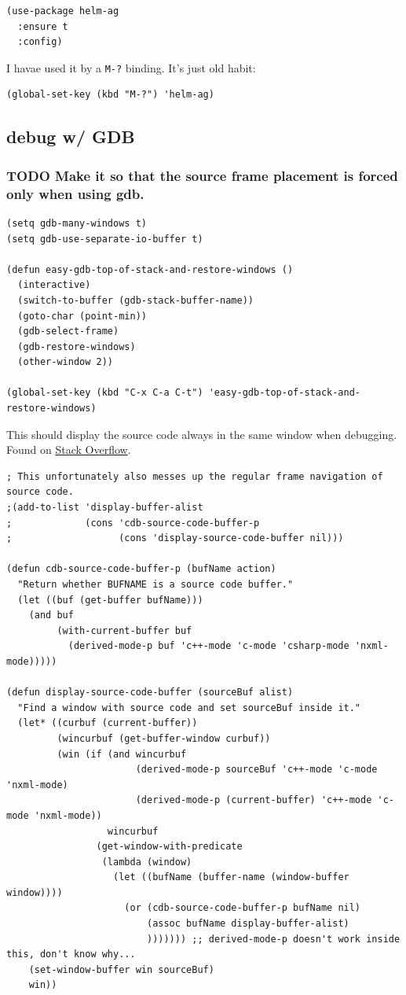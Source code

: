 \documentclass[11pt]{article}
\begin{document}
\begin{verbatim}
(use-package helm-ag
  :ensure t
  :config)
\end{verbatim}

I havae used it by a \texttt{M-?} binding. It's just old habit:
\begin{verbatim}
(global-set-key (kbd "M-?") 'helm-ag)
\end{verbatim}

\subsection{debug w/ GDB}
\label{sec:orge831571}
\subsubsection{{\bfseries\sffamily TODO} Make it so that the source frame placement is forced only when using gdb.}
\label{sec:orgcfc2186}

\begin{verbatim}
(setq gdb-many-windows t)
(setq gdb-use-separate-io-buffer t)

(defun easy-gdb-top-of-stack-and-restore-windows ()
  (interactive)
  (switch-to-buffer (gdb-stack-buffer-name))
  (goto-char (point-min))
  (gdb-select-frame)
  (gdb-restore-windows)
  (other-window 2))

(global-set-key (kbd "C-x C-a C-t") 'easy-gdb-top-of-stack-and-restore-windows)
\end{verbatim}

This should display the source code always in the same window when debugging.
Found on \href{https://stackoverflow.com/questions/39762833/emacsgdb-customization-how-to-display-source-buffer-in-one-window}{Stack Overflow}.
\begin{verbatim}
; This unfortunately also messes up the regular frame navigation of source code.
;(add-to-list 'display-buffer-alist
;             (cons 'cdb-source-code-buffer-p
;                   (cons 'display-source-code-buffer nil)))

(defun cdb-source-code-buffer-p (bufName action)
  "Return whether BUFNAME is a source code buffer."
  (let ((buf (get-buffer bufName)))
    (and buf
         (with-current-buffer buf
           (derived-mode-p buf 'c++-mode 'c-mode 'csharp-mode 'nxml-mode)))))

(defun display-source-code-buffer (sourceBuf alist)
  "Find a window with source code and set sourceBuf inside it."
  (let* ((curbuf (current-buffer))
         (wincurbuf (get-buffer-window curbuf))
         (win (if (and wincurbuf
                       (derived-mode-p sourceBuf 'c++-mode 'c-mode 'nxml-mode)
                       (derived-mode-p (current-buffer) 'c++-mode 'c-mode 'nxml-mode))
                  wincurbuf
                (get-window-with-predicate
                 (lambda (window)
                   (let ((bufName (buffer-name (window-buffer window))))
                     (or (cdb-source-code-buffer-p bufName nil)
                         (assoc bufName display-buffer-alist)
                         ))))))) ;; derived-mode-p doesn't work inside this, don't know why...
    (set-window-buffer win sourceBuf)
    win))
\end{verbatim}
\end{document}
